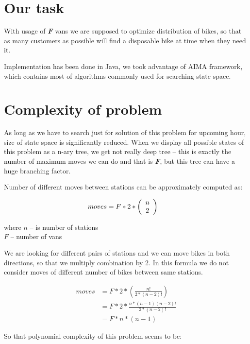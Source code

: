 \documentclass[11pt,twoside,a4paper]{mr}%
\begin{document}
\section{Our task}
With usage of \textbf{\textsl{F}} vans we are supposed to optimize distribution of bikes, so that as many customers as possible will find a disposable bike at time when they need it.

Implementation has been done in Java, we took advantage of AIMA framework\cite{aima}, which contains most of algorithms commonly used for  searching state space.

\section{Complexity of problem}
As long as we have to search just for solution of this problem for upcoming hour, size of state space is significantly reduced. When we display all possible states of this problem as a n-ary tree, we get not really deep tree -- this is exactly the number of maximum moves we can do and that is \textbf{\textsl{F}}, but this tree can have a huge branching factor. 

Number of different moves between stations can be approximately computed as:

\begin{align}
 moves &= F * 2 * \left( {\begin{array}{*{20}c}
n \\
2 \\
\end{array}} \right)
\end{align}

\begin{tabbing}
where     \= \(n\) -- is number of stations\\
	\> \(F\) -- number of vans
 \end{tabbing}

We are looking for different pairs of stations and we can move bikes in both directions, so that we multiply combination by 2. In this formula we do not consider moves of different number of bikes between same stations. 

\begin{align*}
 moves &= F * 2 * \left( \frac{n!}{2* (n-2)!} \right) \\
       &= F * 2 * \frac{n*(n-1)(n-2)!}{2*(n-2)!} \\
       &= F * n * (n-1) 
\end{align*} 

So that polynomial complexity of this problem seems to be:
\end{document}
